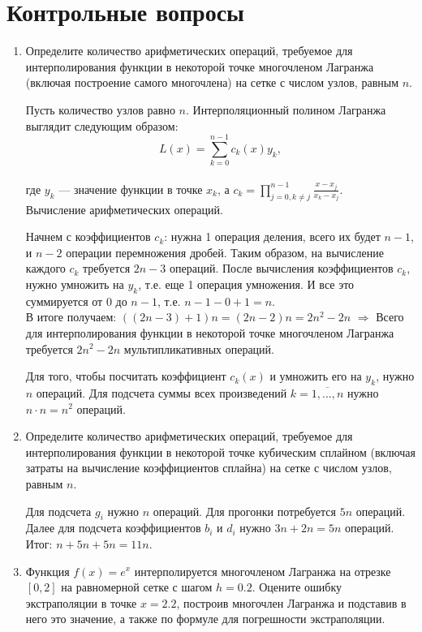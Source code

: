 \documentclass[12pt, a4paper]{article}
\begin{document}
\section{Контрольные вопросы}
\begin{enumerate}

\item Определите количество арифметических операций, требуемое для интерполирования функции в некоторой точке многочленом Лагранжа (включая построение самого многочлена) на сетке с числом узлов, равным $n$.

Пусть количество узлов равно $n$. Интерполяционный полином Лагранжа выглядит следующим образом:\\
$$L(x)=\sum \limits_{k=0}^{n-1} c_k(x) y_k,$$\\ где $y_k$ --- значение функции в точке $x_k$, а $c_k = \prod \limits_{j=0,k\neq j }^{n-1}\frac{x-x_j}{x_k-x_j}.$\\
Вычисление арифметических операций.

Начнем с коэффициентов $c_k$: нужна 1 операция деления, всего их будет $n-1$, и $n-2$ операции перемножения дробей. Таким образом, на вычисление каждого $c_k$ требуется $2n-3$ операций. После вычисления коэффициентов $c_k$, нужно умножить на $y_k$, т.е. еще 1 операция умножения. И все это суммируется от $0$ до $n-1$, т.е. $n-1-0+1=n$.\\
В итоге получаем: $((2n-3)+1)n = (2 n -2)n=2n^2-2n$ $\Rightarrow$ Всего для интерполирования функции в некоторой точке многочленом Лагранжа требуется $2n^2-2n$ мультипликативных операций.


Для того, чтобы посчитать коэффициент $c_k(x)$ и умножить его на $y_k$, нужно $n$ операций. Для подсчета суммы всех произведений $k = \overline{1,..., n}$ нужно $n \cdot n = n^2$ операций.

\item Определите количество арифметических операций, требуемое для интерполирования функции в некоторой точке кубическим сплайном (включая затраты на вычисление коэффициентов сплайна) на сетке с числом узлов, равным $n$.

Для подсчета $g_i$ нужно $n$ операций. Для прогонки потребуется $5n$ операций. Далее для подсчета коэффициентов $b_i$ и $d_i$ нужно $3n + 2n = 5n$ операций. Итог: $n + 5n + 5n = 11n$.

\pagebreak

\item Функция $f(x) = e^x$ интерполируется многочленом Лагранжа на отрезке $[0, 2]$ на равномерной сетке с шагом $h = 0{.}2$. Оцените ошибку экстраполяции в точке $x = 2{.}2$, построив многочлен Лагранжа и подставив в него это значение, а также по формуле для погрешности экстраполяции.


\end{enumerate}
\end{document}
